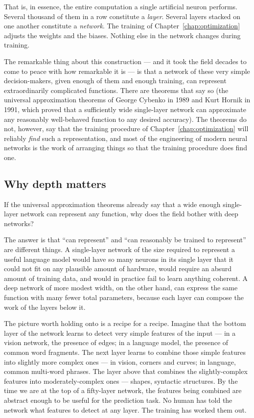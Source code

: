 That is, in essence, the entire computation a single artificial
neuron performs. Several thousand of them in a row constitute a
\emph{layer}. Several layers stacked on one another constitute
a \emph{network}. The training of Chapter~\ref{chap:optimization} adjusts the weights
and the biases. Nothing else in the network changes during
training.

The remarkable thing about this construction --- and it took the
field decades to come to peace with how remarkable it is --- is
that a network of these very simple decision-makers, given
enough of them and enough training, can represent extraordinarily
complicated functions. There are theorems that say so (the
universal approximation theorems of George Cybenko in 1989 and
Kurt Hornik in 1991, which proved that a sufficiently wide
single-layer network can approximate any reasonably well-behaved
function to any desired accuracy). The theorems do not, however,
say that the training procedure of Chapter~\ref{chap:optimization} will reliably
\emph{find} such a representation, and most of the engineering
of modern neural networks is the work of arranging things so
that the training procedure does find one.

\subsection*{Why depth matters}

If the universal approximation theorems already say that a wide
enough single-layer network can represent any function, why does
the field bother with deep networks?

The answer is that ``can represent'' and ``can reasonably be
trained to represent'' are different things. A single-layer
network of the size required to represent a useful language
model would have so many neurons in its single layer that it
could not fit on any plausible amount of hardware, would
require an absurd amount of training data, and would in practice
fail to learn anything coherent. A deep network of more modest
width, on the other hand, can express the same function with
many fewer total parameters, because each layer can compose
the work of the layers below it.

The picture worth holding onto is a recipe for a recipe.
Imagine that the bottom layer of the network learns to detect
very simple features of the input --- in a vision network, the
presence of edges; in a language model, the presence of common
word fragments. The next layer learns to combine those simple
features into slightly more complex ones --- in vision, corners
and curves; in language, common multi-word phrases. The layer
above that combines the slightly-complex features into
moderately-complex ones --- shapes, syntactic structures. By
the time we are at the top of a fifty-layer network, the
features being combined are abstract enough to be useful for
the prediction task. No human has told the network what features
to detect at any layer. The training has worked them out.

